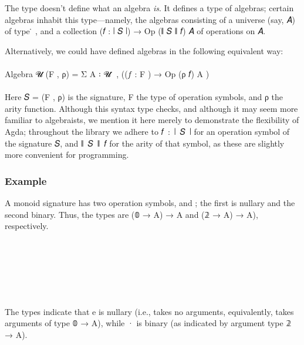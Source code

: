 \documentclass[sigplan,screen]{acmart}
\newcommand\ab[1]{\AgdaBound{#1}}
\newcommand\algebraUS{\AgdaFunction{Algebra}\AgdaSpace{}\AgdaBound{𝓤}\AgdaSpace{}\AgdaBound{𝑆}\xspace}
\begin{document}
The type \algebraUS doesn't define what an algebra \emph{is}. It defines a type of algebras; certain algebras inhabit this type---namely, the algebras consisting of a universe (say, 𝐴) of type \ab 𝓤 ̇ , and a collection (𝑓 : ∣ 𝑆 ∣) → Op (∥ 𝑆 ∥ 𝑓) 𝐴 of operations on 𝐴.

Alternatively, we could have defined algebras in the following equivalent way:\\
\\
  Algebra 𝓤 (F , ρ) = Σ A ꞉ 𝓤 ̇ ,  ((𝑓 : F )  → Op (ρ 𝑓) A )\\
\\
Here 𝑆 = (F , ρ) is the signature, F the type of operation symbols, and ρ the arity function. Although this syntax type checks, and although it may seem more familiar to algebraists, we mention it here merely to demonstrate the flexibility of Agda; throughout the library we adhere to 𝑓~:~∣~𝑆~∣ for an operation symbol of the signature 𝑆, and ∥~𝑆~∥~𝑓 for the arity of that symbol, as these are slightly more convenient for programming.

\subsubsection{Example}
A monoid signature has two operation symbols,  and ; the first is nullary and the second binary. Thus, the types are (𝟘 → A) → A and (𝟚 → A) → A), respectively.
\begin{code}%
\>[0]\AgdaSpace{}%
\AgdaSpace{}%
\AgdaSymbol{:}\AgdaSpace{}%
\AgdaSpace{}%
\AgdaSpace{}%
\<%
\\
\>[0][@{}l@{\AgdaIndent{0}}]%
\>[1]\AgdaSpace{}%
\AgdaSymbol{:}\AgdaSpace{}%
\<%
\\
%
\>[1]\AgdaSpace{}%
\AgdaSymbol{:}\AgdaSpace{}%
\<%
\\
%
\\[\AgdaEmptyExtraSkip]%
\>[0]\AgdaSpace{}%
\AgdaSymbol{:}\AgdaSpace{}%
\AgdaSpace{}%
\AgdaSymbol{\AgdaUnderscore{}}\AgdaSpace{}%
\AgdaSymbol{\AgdaUnderscore{}}\<%
\\
\>[0]\AgdaSpace{}%
\AgdaSymbol{=}\AgdaSpace{}%
\AgdaSpace{}%
\AgdaOperator{\AgdaInductiveConstructor{,}}\AgdaSpace{}%
\AgdaSpace{}%
\AgdaSymbol{\{}\AgdaSpace{}%
\AgdaSpace{}%
\AgdaSpace{}%
\AgdaSymbol{;}\AgdaSpace{}%
\AgdaSpace{}%
\AgdaSpace{}%
\AgdaSpace{}%
\AgdaSymbol{\}}\<%
\end{code}
The types indicate that e is nullary (i.e., takes no arguments, equivalently, takes arguments of type 𝟘 → A), while · is binary (as indicated  by argument type 𝟚 → A).
\end{document}
